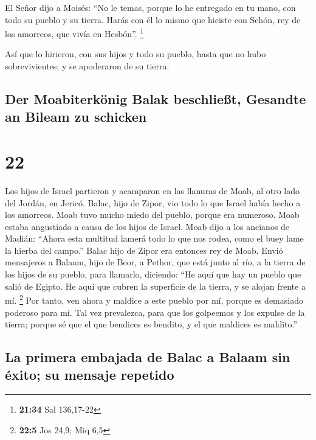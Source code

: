  El Señor dijo a Moisés: ``No le temas, porque lo he
entregado en tu mano, con todo su pueblo y su tierra. Harás con él lo
mismo que hiciste con Sehón, rey de los amorreos, que vivía en Hesbón''.
\footnote{\textbf{21:34} Sal 136,17-22}

 Así que lo hirieron, con sus hijos y todo su pueblo,
hasta que no hubo sobrevivientes; y se apoderaron de su tierra.

\hypertarget{der-moabiterkuxf6nig-balak-beschlieuxdft-gesandte-an-bileam-zu-schicken}{%
\subsection{Der Moabiterkönig Balak beschließt, Gesandte an Bileam zu
schicken}\label{der-moabiterkuxf6nig-balak-beschlieuxdft-gesandte-an-bileam-zu-schicken}}

\hypertarget{section-21}{%
\section{22}\label{section-21}}

 Los hijos de Israel partieron y acamparon en las llanuras
de Moab, al otro lado del Jordán, en Jericó.  Balac, hijo
de Zipor, vio todo lo que Israel había hecho a los amorreos.
 Moab tuvo mucho miedo del pueblo, porque era numeroso.
Moab estaba angustiado a causa de los hijos de Israel. 
Moab dijo a los ancianos de Madián: ``Ahora esta multitud lamerá todo lo
que nos rodea, como el buey lame la hierba del campo.'' Balac hijo de
Zipor era entonces rey de Moab.  Envió mensajeros a
Balaam, hijo de Beor, a Pethor, que está junto al río, a la tierra de
los hijos de su pueblo, para llamarlo, diciendo: ``He aquí que hay un
pueblo que salió de Egipto. He aquí que cubren la superficie de la
tierra, y se alojan frente a mí. \footnote{\textbf{22:5} Jos 24,9; Miq
  6,5}  Por tanto, ven ahora y maldice a este pueblo por
mí, porque es demasiado poderoso para mí. Tal vez prevalezca, para que
los golpeemos y los expulse de la tierra; porque sé que el que bendices
es bendito, y el que maldices es maldito.''

\hypertarget{la-primera-embajada-de-balac-a-balaam-sin-uxe9xito-su-mensaje-repetido}{%
\subsection{La primera embajada de Balac a Balaam sin éxito; su mensaje
repetido}\label{la-primera-embajada-de-balac-a-balaam-sin-uxe9xito-su-mensaje-repetido}}

